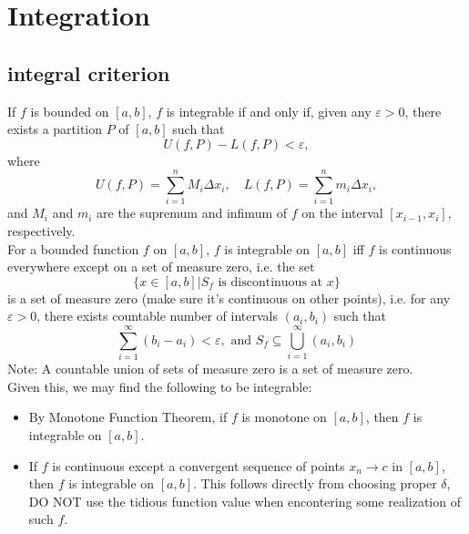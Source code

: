 \documentclass[a4paper,10pt]{article}
\begin{document}
\newpage

\section{Integration}
\subsection{integral criterion}
If $f$ is bounded on $[a,b]$, $f$ is integrable if and only if,
given any $\varepsilon>0$, there exists a partition $P$ of $[a,b]$ such that\[
    U(f,P) - L(f,P) < \varepsilon,
\]
where \[
    U(f,P) = \sum_{i=1}^n M_i\Delta x_i, \quad L(f,P) = \sum_{i=1}^n m_i\Delta x_i,
\]
and $M_i$ and $m_i$ are the supremum and infimum of $f$ on the interval $[x_{i-1}, x_i]$, respectively.\\

\noindent For a bounded function $f$ on $[a,b]$, $f$ is integrable on $[a,b]$ iff $f$ is continuous everywhere except 
on a set of measure zero, i.e. the set\[
    \{x\in[a,b] | S_f \text{ is discontinuous at } x\}
\]
is a set of measure zero (make sure it's continuous on other points), i.e. for any $\varepsilon>0$,
there exists countable number of intervals $(a_i,b_i)$ such that\[
    \sum_{i=1}^\infty (b_i-a_i) < \varepsilon, \text{   and   } S_f\subseteq \bigcup_{i=1}^\infty (a_i,b_i) 
\]
Note: A countable union of sets of measure zero is a set of measure zero.\\

\noindent Given this, we may find the following to be integrable:\begin{itemize}
    \item By Monotone Function Theorem, if $f$ is monotone on $[a,b]$, then $f$ is integrable on $[a,b]$.
    \item If $f$ is continuous except a convergent sequence of points $x_n\to c$ in $[a,b]$, then $f$ is integrable on $[a,b]$.
    This follows directly from choosing proper $\delta$, DO NOT use the tidious function value when encontering
    some realization of such $f$.
\end{itemize}
\end{document}
